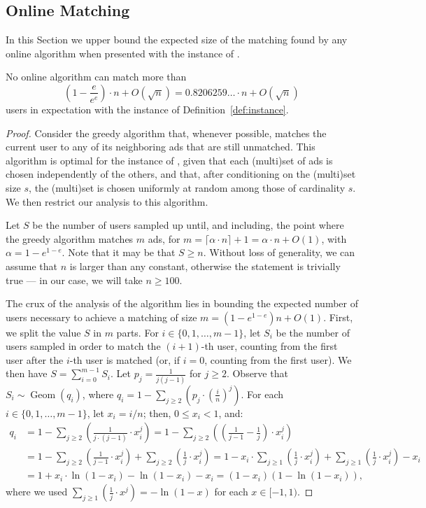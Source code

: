 \documentclass[11pt]{article}
\DeclareMathOperator{\geom}{Geom}
\begin{document}
\subsection{Online Matching}\label{sec:LB:online}
In this Section we upper bound the expected size of the matching found by any online algorithm when presented with the instance of .

\begin{theorem}\label{thm:om}
    No online algorithm can match more than $$\left(1-\frac{e}{e^e}\right) \cdot n + O\left(\sqrt{n}\right) = 0.8206259\ldots \cdot n + O\left(\sqrt{n}\right)$$ users in expectation with the instance of Definition~\ref{def:instance}. \end{theorem}
\begin{proof}
Consider the greedy algorithm that, whenever possible, matches the current user to any of its neighboring ads that are still unmatched. This algorithm is optimal for the instance of , given that each (multi)set of ads is chosen independently of the others, and that, after conditioning on the (multi)set size $s$, the (multi)set is chosen uniformly at random among those of cardinality $s$.  We then restrict our analysis to this algorithm. 

\smallskip

Let  $S$ be the number of users sampled up until, and including, the point where the greedy algorithm matches $m$ ads, for   $m = \lceil \alpha\cdot n \rceil +1 = \alpha \cdot n + O(1)$, with $\alpha = 1 - e^{1-e}$. Note that it may be that $S\geq n$. Without loss of generality, we can assume that $n$ is larger than any constant, otherwise the statement is trivially true --- in our case, we will take $n\geq 100$.

The crux of the analysis of the  algorithm lies in bounding the expected number of users necessary to achieve a matching of size $m=(1-e^{1-e})n + O(1)$. 
First, we split the value $S$ in $m$ parts.
For $i\in\{0,1,\dots, m-1\}$, let $S_i$ be the number of users sampled in order to match the $(i+1)$-th user, counting from the first user after the $i$-th user is matched (or, if $i = 0$, counting from the first user). We then have $S=\sum_{i=0}^{m-1} S_i$. 
Let $p_j = \frac{1}{j(j-1)}$ for $j\geq 2$. Observe that $S_i \sim \geom(q_i)$, where $q_i = 1- \sum_{j \ge 2} \left(p_j \cdot \left(\frac in\right)^j\right)$. For each $i \in \{0,1,\ldots,m-1\}$, let $x_i = i/n$; then, $0 \le x_i < 1$, and:
\begin{align}
q_i &= 1 - \sum_{j \ge 2} \left(\frac1{j\cdot(j-1)} \cdot  x_i^j\right) = 1 - \sum_{j \ge 2} \left(\left(\frac1{j-1} - \frac1j\right) \cdot  x_i^j\right) \nonumber\\
&=1 - \sum_{j \ge 2} \left(\frac1{j-1}  \cdot  x_i^j\right) + \sum_{j \ge 2} \left(\frac1{j}  \cdot  x_i^j\right) 
=1 - x_i\cdot \sum_{j \ge 1} \left(\frac1{j}  \cdot  x_i^j\right) + \sum_{j \ge 1} \left(\frac1{j}  \cdot  x_i^j\right) - x_i \nonumber \\
&=1 + x_i\cdot \ln(1-x_i) - \ln(1-x_i) - x_i  = (1 - x_i) (1 - \ln(1 - x_i)),\label{eqn:qi}
\end{align}
where we used $\sum_{j \ge 1} \left(\frac1j \cdot x^j\right) = -\ln(1-x)$ for each $x \in [-1,1)$.


\end{proof}
\end{document}
